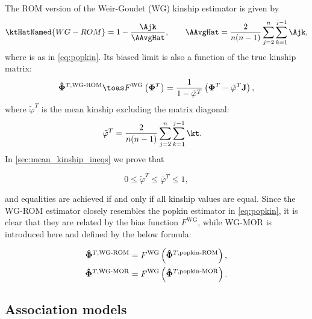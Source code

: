\documentclass[11pt]{article}
\newcommand{\kinMat}[1][T]{%
  \ensuremath{%
    \mathbf{\Phi}^{#1}
  }%
  \xspace%
}%
\newcommand{\kinMatEstNamed}[1]{%
  \ensuremath{%
    \mathbf{\hat{\Phi}}^{T,\text{#1}}
  }%
  \xspace%
}%
\begin{document}
\begin{linenumbers}
The ROM version of the Weir-Goudet (WG) kinship estimator is given by \citep{weir_unified_2017, ochoa_estimating_2021}
\begin{equation}
  \label{eq:wg}
  \ktHatNamed{WG-ROM}
  =
  1 - \frac{\Ajk}{\AAvgHat}
  , \quad\quad
  \AAvgHat
  =
  \frac{2}{n(n-1)}
  \sum_{j=2}^n
  \sum_{k=1}^{j-1}
    \Ajk
    ,
\end{equation}
where \Ajk is as in \cref{eq:popkin}.
Its biased limit is also a function of the true kinship matrix:
\begin{equation}
  \label{eq:wg_lim}
  \kinMatEstNamed{WG-ROM}
  \toas
  F^\text{WG} \left( \kinMat \right)
  =
  \frac{1}{1 - \tilde{\varphi}^T}
  \left( \kinMat - \tilde{\varphi}^T \mathbf{J} \right)
  ,
\end{equation}
where $\tilde{\varphi}^T$ is the mean kinship excluding the matrix diagonal:
\begin{equation}
  \label{eq:wg_tilde}
  \begin{split}
    \tilde{\varphi}^T
    &=
    \frac{2}{n(n-1)}
    \sum_{j=2}^n
    \sum_{k=1}^{j-1}
    \kt
    .
  \end{split}
\end{equation}
In \cref{sec:mean_kinship_ineqs} we prove that
\begin{linenomath*}
$$
0 \le \tilde{\varphi}^T \le \bar{\varphi}^T \le 1,
$$
\end{linenomath*}
and equalities are achieved if and only if all kinship values are equal.
Since the WG-ROM estimator closely resembles the popkin estimator in \cref{eq:popkin}, it is clear that they are related by the bias function $F^\text{WG}$, while WG-MOR is introduced here and defined by the below formula:
\begin{linenomath*}
\begin{align*}
  \kinMatEstNamed{WG-ROM}
  &=
    F^\text{WG} \left( \kinMatEstNamed{popkin-ROM} \right)
    , \\
  \kinMatEstNamed{WG-MOR}
  &=
    F^\text{WG} \left( \kinMatEstNamed{popkin-MOR} \right)
  .
\end{align*}
\end{linenomath*}

\subsection{Association models}


\end{linenumbers}
\end{document}
